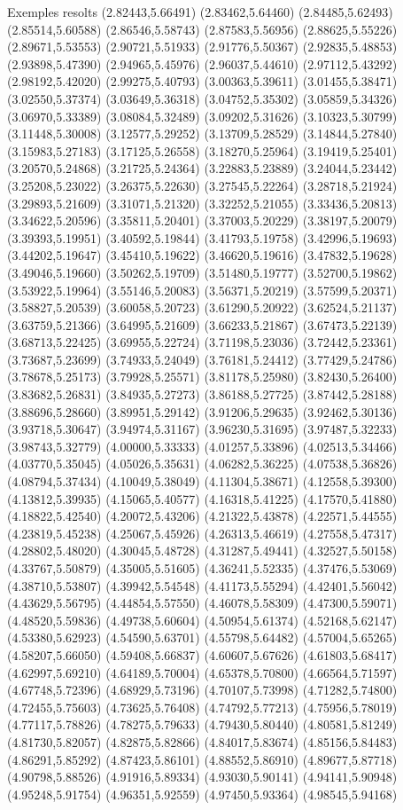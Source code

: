 \documentclass[11pt,a4paper]{article}
\begin{document}
\begin{fmex}{Exemples resolts}
(2.82443,5.66491) (2.83462,5.64460) (2.84485,5.62493) (2.85514,5.60588) (2.86546,5.58743) (2.87583,5.56956) (2.88625,5.55226) (2.89671,5.53553) (2.90721,5.51933) (2.91776,5.50367) (2.92835,5.48853) (2.93898,5.47390) (2.94965,5.45976) (2.96037,5.44610) (2.97112,5.43292) (2.98192,5.42020) (2.99275,5.40793) (3.00363,5.39611) (3.01455,5.38471) (3.02550,5.37374) (3.03649,5.36318) (3.04752,5.35302) (3.05859,5.34326) (3.06970,5.33389) (3.08084,5.32489) (3.09202,5.31626) (3.10323,5.30799) (3.11448,5.30008) (3.12577,5.29252) (3.13709,5.28529) (3.14844,5.27840) (3.15983,5.27183) (3.17125,5.26558) (3.18270,5.25964) (3.19419,5.25401) (3.20570,5.24868) (3.21725,5.24364) (3.22883,5.23889) (3.24044,5.23442) (3.25208,5.23022) (3.26375,5.22630) (3.27545,5.22264) (3.28718,5.21924) (3.29893,5.21609) (3.31071,5.21320) (3.32252,5.21055) (3.33436,5.20813) (3.34622,5.20596) (3.35811,5.20401) (3.37003,5.20229) (3.38197,5.20079) (3.39393,5.19951) (3.40592,5.19844) (3.41793,5.19758) (3.42996,5.19693) (3.44202,5.19647) (3.45410,5.19622) (3.46620,5.19616) (3.47832,5.19628) (3.49046,5.19660) (3.50262,5.19709) (3.51480,5.19777) (3.52700,5.19862) (3.53922,5.19964) (3.55146,5.20083) (3.56371,5.20219) (3.57599,5.20371) (3.58827,5.20539) (3.60058,5.20723) (3.61290,5.20922) (3.62524,5.21137) (3.63759,5.21366) (3.64995,5.21609) (3.66233,5.21867) (3.67473,5.22139) (3.68713,5.22425) (3.69955,5.22724) (3.71198,5.23036) (3.72442,5.23361) (3.73687,5.23699) (3.74933,5.24049) (3.76181,5.24412) (3.77429,5.24786) (3.78678,5.25173) (3.79928,5.25571) (3.81178,5.25980) (3.82430,5.26400) (3.83682,5.26831) (3.84935,5.27273) (3.86188,5.27725) (3.87442,5.28188) (3.88696,5.28660) (3.89951,5.29142) (3.91206,5.29635) (3.92462,5.30136) (3.93718,5.30647) (3.94974,5.31167) (3.96230,5.31695) (3.97487,5.32233) (3.98743,5.32779) (4.00000,5.33333) (4.01257,5.33896) (4.02513,5.34466) (4.03770,5.35045) (4.05026,5.35631) (4.06282,5.36225) (4.07538,5.36826) (4.08794,5.37434) (4.10049,5.38049) (4.11304,5.38671) (4.12558,5.39300) (4.13812,5.39935) (4.15065,5.40577) (4.16318,5.41225) (4.17570,5.41880) (4.18822,5.42540) (4.20072,5.43206) (4.21322,5.43878) (4.22571,5.44555) (4.23819,5.45238) (4.25067,5.45926) (4.26313,5.46619) (4.27558,5.47317) (4.28802,5.48020) (4.30045,5.48728) (4.31287,5.49441) (4.32527,5.50158) (4.33767,5.50879) (4.35005,5.51605) (4.36241,5.52335) (4.37476,5.53069) (4.38710,5.53807) (4.39942,5.54548) (4.41173,5.55294) (4.42401,5.56042) (4.43629,5.56795) (4.44854,5.57550) (4.46078,5.58309) (4.47300,5.59071) (4.48520,5.59836) (4.49738,5.60604) (4.50954,5.61374) (4.52168,5.62147) (4.53380,5.62923) (4.54590,5.63701) (4.55798,5.64482) (4.57004,5.65265) (4.58207,5.66050) (4.59408,5.66837) (4.60607,5.67626) (4.61803,5.68417) (4.62997,5.69210) (4.64189,5.70004) (4.65378,5.70800) (4.66564,5.71597) (4.67748,5.72396) (4.68929,5.73196) (4.70107,5.73998) (4.71282,5.74800) (4.72455,5.75603) (4.73625,5.76408) (4.74792,5.77213) (4.75956,5.78019) (4.77117,5.78826) (4.78275,5.79633) (4.79430,5.80440) (4.80581,5.81249) (4.81730,5.82057) (4.82875,5.82866) (4.84017,5.83674) (4.85156,5.84483) (4.86291,5.85292) (4.87423,5.86101) (4.88552,5.86910) (4.89677,5.87718) (4.90798,5.88526) (4.91916,5.89334) (4.93030,5.90141) (4.94141,5.90948) (4.95248,5.91754) (4.96351,5.92559) (4.97450,5.93364) (4.98545,5.94168) 
\end{fmex}
\end{document}
